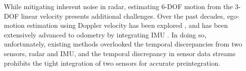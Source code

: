 While mitigating inherent noise in radar, estimating 6-\ac{DOF} motion from the 3-\ac{DOF} linear velocity presents additional challenges.
Over the past decades, ego-motion estimation using Doppler velocity has been explored \cite{kellner2013instantaneous, kramer2020radar, haggag2022credible}, and has been extensively advanced to odometry by integrating \ac{IMU} \cite{DoerENC2020, park20213d, michalczyk2022tightly, zhuang20234d, do2024dero}.
In doing so, unfortunately, existing methods overlooked the temporal discrepancies from two sensors, radar and \ac{IMU}, and the temporal discrepancy in sensor data streams prohibits the tight integration of two sensors for accurate preintegration.



